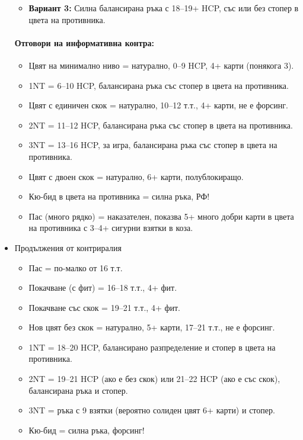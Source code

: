 \documentclass[10pt,a5paper]{extarticle}
\begin{document}
\begin{itemize}
\begin{itemize}
            \item[] \textbf{Вариант 3:} Силна балансирана ръка с 18--19+ HCP, със или без стопер в цвета на противника.  
        \end{itemize}
        \paragraph{Отговори на информативна контра:}
        \begin{itemize}
            \item[] Цвят на минимално ниво = натурално, 0--9 HCP, 4+ карти (понякога 3).  
            \item[] 1NT = 6--10 HCP, балансирана ръка със стопер в цвета на противника.  
            \item[] Цвят с единичен скок = натурално, 10--12 т.т., 4+ карти, не е форсинг.  
            \item[] 2NT = 11--12 HCP, балансирана ръка със стопер в цвета на противника.  
            \item[] 3NT = 13--16 HCP, за игра, балансирана ръка със стопер в цвета на противника.  
            \item[] Цвят с двоен скок = натурално, 6+ карти, полублокиращо.  
            \item[] Кю-бид в цвета на противника = силна ръка, РФ!  
            \item[] Пас (много рядко) = наказателен, показва 5+ много добри карти в цвета на противника с 3--4+ сигурни взятки в коза.  
        \end{itemize}


    \item[]{Продължения от контриралия}
        \begin{itemize}
            \item[] Пас = по-малко от 16 т.т.  
            \item[] Покачване (с фит) = 16--18 т.т., 4+ фит.  
            \item[] Покачване със скок = 19--21 т.т., 4+ фит.  
            \item[] Нов цвят без скок = натурално, 5+ карти, 17--21 т.т., не е форсинг.  
            \item[] 1NT = 18--20 HCP, балансирано разпределение и стопер в цвета на противника.  
            \item[] 2NT = 19--21 HCP (ако е без скок) или 21--22 HCP (ако е със скок), балансирана ръка и стопер.  
            \item[] 3NT = ръка с 9 взятки (вероятно солиден цвят 6+ карти) и стопер.  
            \item[] Кю-бид = силна ръка, форсинг!  
        \end{itemize}
\end{itemize}
\end{document}
